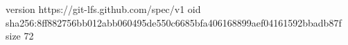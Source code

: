 version https://git-lfs.github.com/spec/v1
oid sha256:8ff882756bb012abb060495de550c6685bfa406168899aef04161592bbadb87f
size 72
